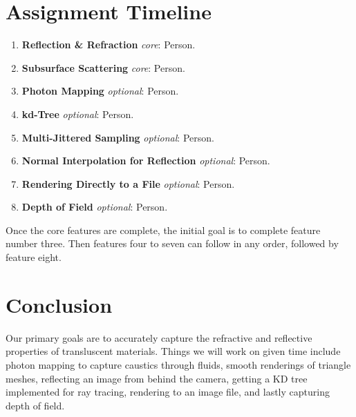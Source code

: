 \documentclass[journal, a4paper]{IEEEtran}
\begin{document}
\section{Assignment Timeline}
    \begin{enumerate}
        \item \textbf{Reflection \& Refraction} \emph{core}: Person.
        \item \textbf{Subsurface Scattering} \emph{core}: Person.
        \item \textbf{Photon Mapping} \emph{optional}: Person.
        \item \textbf{kd-Tree} \emph{optional}: Person.
        \item \textbf{Multi-Jittered Sampling} \emph{optional}: Person.
        \item \textbf{Normal Interpolation for Reflection} \emph{optional}: Person.
        \item \textbf{Rendering Directly to a File} \emph{optional}: Person.
        \item \textbf{Depth of Field} \emph{optional}: Person.
    \end{enumerate}
    Once the core features are complete, the initial goal is to complete feature number three. Then features four to seven can follow in any order, followed by feature eight.

\section{Conclusion}
    Our primary goals are to accurately capture the refractive and reflective properties of transluscent materials. Things we will work on given time include photon mapping to capture caustics through fluids, smooth renderings of triangle meshes, reflecting an image from behind the camera, getting a KD tree implemented for ray tracing, rendering to an image file, and lastly  capturing depth of field.


\end{document}
